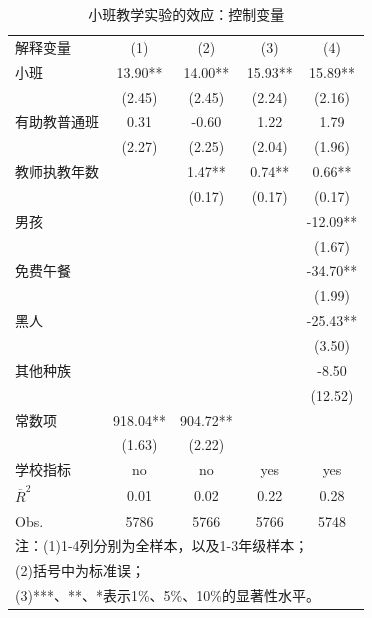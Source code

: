 \documentclass[cn,12pt,math=newtx,citestyle=gb7714-2015,bibstyle=gb7714-2015]{elegantbook}
\begin{document}
	\begin{center}
		\begin{table}[!h]
			\caption{小班教学实验的效应：控制变量}\label{tab:digit}
			\begin{center}
				\begin{tabular}{lcccc}
					\hline
					解释变量&(1)&(2)&(3)&(4)\\
					\cline{1-5}
					小班&13.90**&14.00**&15.93**&15.89**\\
					&(2.45)&(2.45)&(2.24)&(2.16)\\
					
					有助教普通班&0.31&-0.60&1.22&1.79\\
					&(2.27)&(2.25)&(2.04)&(1.96)\\
					
					教师执教年数&&1.47**&0.74**&0.66**\\
					&&(0.17)&(0.17)&(0.17)\\
					
					男孩&&&&-12.09**\\
					&&&&(1.67)\\
					
					免费午餐&&&&-34.70**\\
					&&&&(1.99)\\
					
					黑人&&&&-25.43**\\
					&&&&(3.50)\\
					
					其他种族&&&&-8.50\\
					&&&&(12.52)\\
					
					常数项&918.04**&904.72**&&\\
					&(1.63)&(2.22)&&\\
					
					\cline{1-5}
					学校指标&no&no&yes&yes\\
					$\overline{R}^2$&0.01&0.02&0.22&0.28\\
					
					Obs.&5786&5766&5766&5748\\
					
					\cline{1-5}
					\multicolumn{5}{l}{注：(1)1-4列分别为全样本，以及1-3年级样本；}\\
					\multicolumn{5}{l}{(2)括号中为标准误；}\\
					\multicolumn{5}{l}{(3)***、**、*表示1\%、5\%、10\%的显著性水平。}\\
					\hline
				\end{tabular}
			\end{center}
		\end{table}
	\end{center}
	
\end{document}
